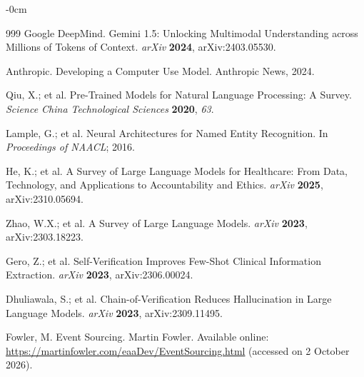 \documentclass[journal,article,submit,moreauthors]{Definitions/mdpi}
\begin{document}
\begin{adjustwidth}{-\extralength}{0cm}
\begin{thebibliography}{999}
Google DeepMind. Gemini 1.5: Unlocking Multimodal Understanding across Millions of Tokens of Context. \textit{arXiv} \textbf{2024}, arXiv:2403.05530.

Anthropic. Developing a Computer Use Model. Anthropic News, 2024.

Qiu, X.; et al. Pre-Trained Models for Natural Language Processing: A Survey. \textit{Science China Technological Sciences} \textbf{2020}, \textit{63}.

Lample, G.; et al. Neural Architectures for Named Entity Recognition. In \textit{Proceedings of NAACL}; 2016.

He, K.; et al. A Survey of Large Language Models for Healthcare: From Data, Technology, and Applications to Accountability and Ethics. \textit{arXiv} \textbf{2025}, arXiv:2310.05694.

Zhao, W.X.; et al. A Survey of Large Language Models. \textit{arXiv} \textbf{2023}, arXiv:2303.18223.

Gero, Z.; et al. Self-Verification Improves Few-Shot Clinical Information Extraction. \textit{arXiv} \textbf{2023}, arXiv:2306.00024.

Dhuliawala, S.; et al. Chain-of-Verification Reduces Hallucination in Large Language Models. \textit{arXiv} \textbf{2023}, arXiv:2309.11495.

Fowler, M. Event Sourcing. Martin Fowler. Available online: \url{https://martinfowler.com/eaaDev/EventSourcing.html} (accessed on 2 October 2026).

\end{thebibliography}

%

\PublishersNote{}
\end{adjustwidth}
\end{document}
